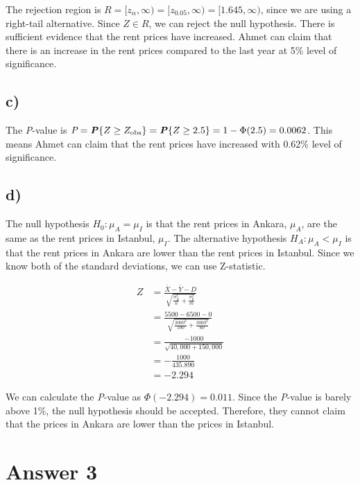 \documentclass[12pt]{article}
\begin{document}
The rejection region is $R = [\textit{z}_{\alpha}, \infty) = [\textit{z}_{0.05},
\infty) = [1.645, \infty)$, since we are using a right-tail alternative. Since
$Z \in R$, we can reject the null hypothesis. There is sufficient evidence that
the rent prices have increased. Ahmet can claim that there is an increase in the
rent prices compared to the last year at 5\% level of significance.

\subsection*{c)}

The \textit{P}-value is $\textit{P} = \textbf{\textit{P}}\{Z \geq Z_\text{obs}\}
= \textbf{\textit{P}}\{Z \geq 2.5\} = 1 - \Phi(2.5) = 0.0062$. This means Ahmet
can claim that the rent prices have increased with 0.62\% level of significance.

\subsection*{d)}

The null hypothesis $H_0: \mu_A = \mu_I$ is that the rent prices in Ankara,
$\mu_A$, are the same as the rent prices in Istanbul, $\mu_I$. The alternative
hypothesis $H_A: \mu_A < \mu_I$ is that the rent prices in Ankara are lower than
the rent prices in Istanbul. Since we know both of the standard deviations, we
can use Z-statistic.

\begin{align*}
    Z &= \frac{\bar{X} - \bar{Y} - D}
              {\sqrt{\frac{\sigma_X^2}{n}+\frac{\sigma_Y^2}{m}}} \\[0.75ex]
    &= \frac{5500 - 6500 - 0}
            {\sqrt{\frac{2000^2}{100}+\frac{3000^2}{60}}} \\[0.75ex]
    &= \frac{-1000}{\sqrt{40,000+150,000}} \\[0.75ex]
    &= -\frac{1000}{435.890} \\[0.75ex]
    &= -2.294
\end{align*}

We can calculate the \textit{P}-value as $\Phi(-2.294) = 0.011$. Since the
\textit{P}-value is barely above 1\%, the null hypothesis should be accepted.
Therefore, they cannot claim that the prices in Ankara are lower than the prices
in Istanbul.


\section*{Answer 3}
\end{document}
